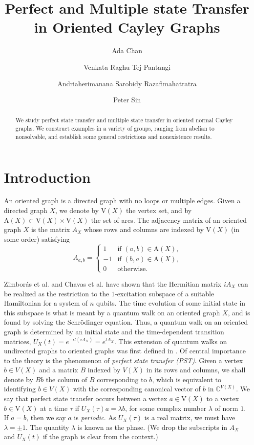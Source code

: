 \documentclass{amsart}
\title{Perfect and Multiple state Transfer in Oriented Cayley Graphs}
\author{Ada Chan}
\author[V.R.T. Pantangi]{Venkata Raghu Tej Pantangi}
\author[S.Razafimahatratra]{Andriaherimanana Sarobidy Razafimahatratra}
\author{Peter Sin}
\theoremstyle{plain}
\theoremstyle{remark}\newtheorem{con}[theorem]{Construction}
\theoremstyle{remark} \newtheorem*{remark}{Remark}
\theoremstyle{remark} \newtheorem{example}{Example}
\newcommand{\mrm}{\mathrm}
\begin{document}
\begin{abstract} We study perfect state transfer and multiple state transfer in oriented normal Cayley graphs. We construct examples in a variety of groups, ranging from abelian to nonsolvable, and establish some general restrictions and nonexistence results.
\end{abstract}
\maketitle
\section{Introduction}
An oriented graph is a directed graph with no loops or multiple edges. Given a directed graph $X$, we denote by $\mrm{V}(X)$  the vertex set, and by $\mrm{A}(X) \subset \mrm{V}(X)\times \mrm{V}(X)$ the set of arcs. The adjacency matrix of an oriented graph $X$ is the matrix $A_X$ whose rows and columns are indexed by $\mrm{V}(X)$ (in some order) satisfying 
\[ 
A_{a,b} = \begin{cases} 1 & \text{if $(a,b) \in \mrm{A}(X)$,} \\
-1 & \text{if $(b,a) \in \mrm{A}(X)$,} \\
0 & \text{otherwise.}
\end{cases}
\] 

Zimbor\'as et al. \cite{Zimboras_et_al} and Chavas et al. \cite[Theorem 2.1]{Chaves_et_al} have shown that the Hermitian matrix
$iA_X$ can be realized as the restriction to the $1$-excitation subspace of a suitable Hamiltonian
for a system of $n$ qubits. The time evolution of some initial state in this subspace is what
is meant by a quantum walk on an oriented graph $X$, and is found by solving the
Schr\"odinger equation. Thus, a quantum walk on an oriented graph is determined by an initial state and the time-dependent transition matrices, $U_X(t)=e^{-it(iA_X)}=e^{tA_X}$. 
This extension of quantum walks on undirected graphs to oriented graphs was first defined in \cite{cameron2014universal}. Of central importance to the theory is the phenomenon of {\it perfect state transfer (PST)}. Given a vertex $b\in V(X)$ and a matrix $B$ indexed by $V(X)$ in its rows and columns, we shall denote by $Bb$ the column of $B$ corresponding to $b$, which is equivalent to identifying $b \in V(X)$ with the corresponding canonical vector of $b$ in $\mathbb{C}^{V(X)}$. We say that perfect state transfer occurs between a vertex $a \in \mrm{V}(X)$ to a vertex $b \in \mrm{V}(X)$ at a time $\tau$ if $U_X(\tau)a = \lambda b$, for some complex number $\lambda $ of norm $1$. 
If $a=b$, then we say $a$ is {\it periodic}.  As $U_X(\tau)$ is a real matrix, we must have $\lambda= \pm 1$. The quantity $\lambda$ is known as the phase.  (We drop the subscripts in $A_X$ and $U_X(t)$ if the graph is clear from the context.)
\end{document}

